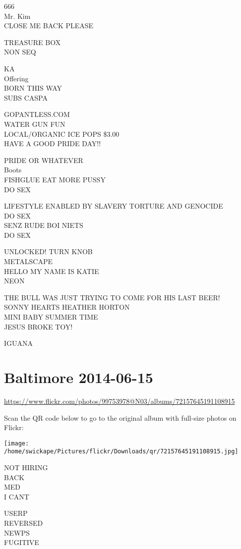 \documentclass[10pt,letterpaper]{article}
\begin{document}
666\\
Mr. Kim\\
CLOSE ME BACK PLEASE

TREASURE BOX\\
NON SEQ

KA\\
Offering\\
BORN THIS WAY\\
SUBS CASPA

GOPANTLESS.COM\\
WATER GUN FUN\\
LOCAL/ORGANIC ICE POPS \$3.00\\
HAVE A GOOD PRIDE DAY!!

PRIDE OR WHATEVER\\
Boots\\
FISHGLUE EAT MORE PUSSY\\
DO SEX

LIFESTYLE ENABLED BY SLAVERY TORTURE AND GENOCIDE\\
DO SEX\\
SENZ RUDE BOI NIETS\\
DO SEX

UNLOCKED!  TURN KNOB\\
METALSCAPE\\
HELLO MY NAME IS KATIE\\
NEON

THE BULL WAS JUST TRYING TO COME FOR HIS LAST BEER!\\
SONNY HEARTS HEATHER HORTON\\
MINI BABY SUMMER TIME\\
JESUS BROKE TOY!

IGUANA
\pagebreak

\section*{Baltimore 2014-06-15}

\url{https://www.flickr.com/photos/99753978@N03/albums/72157645191108915}

Scan the QR code below to go to the original album with full-size photos on Flickr:

\texttt{[image: /home/swickape/Pictures/flickr/Downloads/qr/72157645191108915.jpg]}
\pagebreak

NOT HIRING\\
BACK\\
MED\\
I CANT

USERP\\
REVERSED\\
NEWPS\\
FUGITIVE
\end{document}
